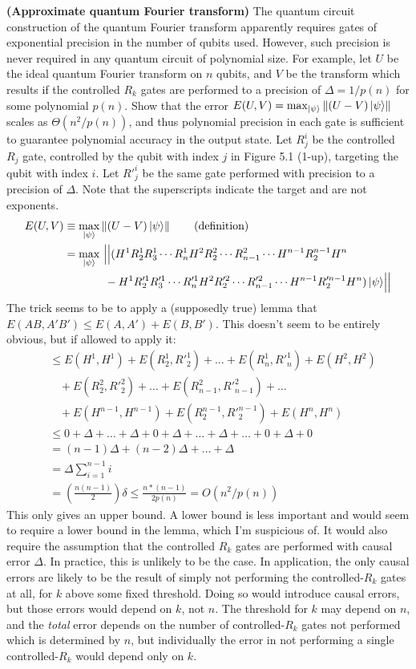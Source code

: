  \textbf{(Approximate quantum Fourier transform)}  The quantum circuit construction of the quantum Fourier transform apparently requires gates of exponential precision in the number of qubits used.  However, such precision is never required in any quantum circuit of polynomial size.  For example, let $U$ be the ideal quantum Fourier transform on $n$ qubits, and $V$ be the transform which results if the controlled $R_k$ gates are performed to a precision of $\Delta = 1/p(n)$ for some polynomial $p(n)$.  Show that the error $E(U,V)=\max_{\ket{\psi}}\left\lVert(U-V)\ket{\psi}\right\rVert$ scales as $\Theta(n^2/p(n))$, and thus polynomial precision in each gate is sufficient to guarantee polynomial accuracy in the output state.
\Soln 
Let $R^i_j$ be the controlled $R_j$ gate, controlled by the qubit with index $j$ in Figure 5.1 (1-up), targeting the qubit with index $i$.  Let $R'^i_j$ be the same gate performed with precision to a precision of $\Delta$.  Note that the superscripts indicate the target and are not exponents.
\begin{align*}
E(U,V) &\equiv \max_{\ket{\psi}}\left\lVert(U-V)\ket{\psi}\right\rVert \tag{definition} \\
&= \max_{\ket{\psi}}\ \Bigl|\Bigl|(H^1R^1_2R^1_3\cdots R^1_n H^2R^2_2\cdots R^2_{n-1}\cdots H^{n-1}R^{n-1}_2 H^n \\
&\ \ \ \ \ \ \ \ \ \ \ -H^1R'^1_2R'^1_3\cdots R'^1_n H^2R'^2_2\cdots R'^2_{n-1}\cdots H^{n-1}R'^{n-1}_2 H^n)\ket{\psi}\Bigr|\Bigr|
\end{align*}
The trick seems to be to apply a (supposedly true) lemma that $E(AB,A'B') \leq E(A,A')+E(B,B')$. This doesn't seem to be entirely obvious, but if allowed to apply it:
\begin{align*}
&\leq E(H^1, H^1) + E(R_2^1,R'^1_2) + \ldots + E(R_n^1, R'^1_n) + E(H^2, H^2) \\
&\ \ \ \ + E(R_2^2,R'^2_2) + \ldots + E(R_{n-1}^2, R'^2_{n-1}) +\ldots \\
&\ \ \ \ + E(H^{n-1}, H^{n-1}) + E(R^{n-1}_2, R'^{n-1}_2) + E(H^n,H^n) \\
&\leq 0+\Delta + \ldots + \Delta + 0 + \Delta +\ldots + \Delta + \ldots + 0 + \Delta + 0 \\
&= (n-1)\Delta + (n-2)\Delta + \ldots + \Delta \\
&= \Delta\sum_{i=1}^{n-1} i \\
&= \left(\frac{n(n-1)}{2}\right)\delta \leq \frac{n*(n-1)}{2p(n)} = O(n^2/p(n))
\end{align*}
This only gives an upper bound.  A lower bound is less important and would seem to require a lower bound in the lemma, which I'm suspicious of.  It would also require the assumption that the controlled $R_k$ gates are performed with causal error $\Delta$.  In practice, this is unlikely to be the case.  In application, the only causal errors are likely to be the result of simply not performing the controlled-$R_k$ gates at all, for $k$ above some fixed threshold.  Doing so would introduce causal errors, but those errors would depend on $k$, not $n$. The threshold for $k$ may depend on $n$, and the \textit{total} error depends on the number of controlled-$R_k$ gates not performed which is determined by $n$, but individually the error in not performing a single controlled-$R_k$ would depend only on $k$.


